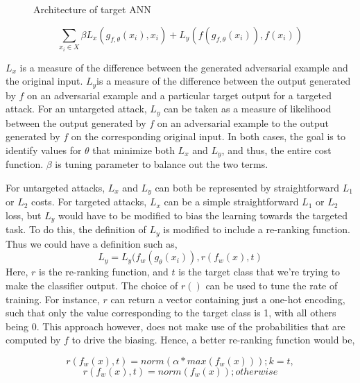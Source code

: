 \documentclass[12pt, conference, letterpaper]{IEEEtran}
\begin{document}
{{{{{{\begin{figure}[h!]
\begin{tikzpicture}[inner sep=1pt, >=latex, 
   label/.style={auto, inner sep=1pt, circle}
   ]
\end{tikzpicture}
\caption{Architecture of target ANN}
\end{figure}


\indent $$\sum\limits_{x_{i}\in X}\beta L_{x}(g_{f, \theta}
(x_{i}), x_{i}) + L_{y}(f(g_{f, \theta}
(x_{i})),f(x_{i}))$$


$L_{x}$ is a measure of the difference between the generated 
adversarial example and the original input. $L_{y }$is a measure of 
the difference between the output generated by $f$ on an adversarial 
example and a particular target output for a targeted attack. For an 
untargeted attack, $L_{y}$ can be taken as a measure of likelihood 
between the output generated by $f$ on an adversarial example to the 
output generated by $f$ on the corresponding original input. In both 
cases, the goal is to identify values for $\theta $ that minimize both 
$L_{x}$ and $L_{y}$, and thus, the entire cost function. $\beta 
$ is tuning parameter to balance out the two terms.



For untargeted attacks, $L_{x}$ and $L_{y}$ can both be 
represented by straightforward $L_{1}$ or $L_{2}$ costs. For 
targeted attacks, $L_{x}$ can be a simple straightforward $L_{1}$ 
or $L_{2}$ loss, but $L_{y}$ would have to be modified to bias the 
learning towards the targeted task. To do this, the definition of $L{
_y}$ is modified to include a re-ranking function. Thus we could have a 
definition such as,
$$ L_{y} = L_{y}(f_{w}(g_{\theta}
(x_{i})),r(f_{w}(x), t)  $$
Here, $r$ is the re-ranking function, and $t$ is the target class that we're 
trying to make the classifier output. The choice of $r()$ can be used to 
tune the rate of training. For instance, $r$ can return a vector 
containing just a one-hot encoding, such that only the value 
corresponding to the target class is 1, with all others being 0. This 
approach however, does not make use of the probabilities that are 
computed by $f$ to drive the biasing. Hence, a better re-ranking function 
would be,

$$ r(f_{w}(x),t) = norm(\alpha *max(f_{w}(x))); k = t,$$
$$ r(f_{w}(x),t) = norm(f_{w}(x)); otherwise $$

\begin{figure}[h]
   
   \label{fig:cclogo}
\end{figure}}}}}}}
\end{document}
